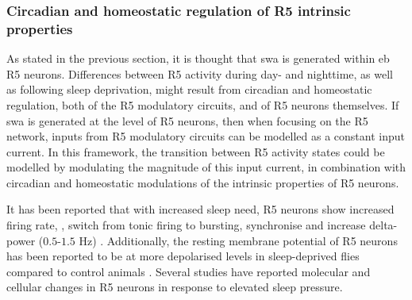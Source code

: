 \documentclass[../main.tex]{subfiles}
\begin{document}
\subsubsection{Circadian and homeostatic regulation of R5 intrinsic properties} \label{subsubsec:circ_and_hemeo_r5}

As stated in the previous section, it is thought that \gls{swa} is generated within \gls{eb} R5 neurons.
Differences between R5 activity during day- and nighttime, as well as following sleep deprivation, might result from circadian and homeostatic regulation, both of the R5 modulatory circuits, and of R5 neurons themselves. If \gls{swa} is generated at the level of R5 neurons, then when focusing on the R5 network, inputs from R5 modulatory circuits can be modelled as a constant input current. In this framework, the transition between R5 activity states could be modelled by modulating the magnitude of this input current, in combination with circadian and homeostatic modulations of the intrinsic properties of R5 neurons.

It has been reported that with increased sleep need, R5 neurons show increased firing rate, \parencite{raccugliaNetworkSpecificSynchronizationElectrical2019,liuSleepDriveEncoded2016},
switch from tonic firing to bursting, synchronise and increase delta-power ($0.5$-$1.5$ Hz) \parencite{raccugliaNetworkSpecificSynchronizationElectrical2019}. Additionally, the resting membrane potential of R5 neurons has been reported to be at more depolarised levels in sleep-deprived flies compared to control animals \parencite{liuSleepDriveEncoded2016}. Several studies have reported molecular and cellular changes in R5 neurons in response to elevated sleep pressure.
\end{document}
